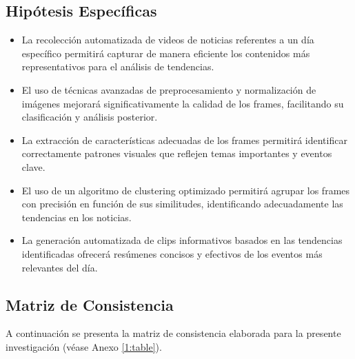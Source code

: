 \HipotesisGeneral
\subsection{Hipótesis Específicas}
\newcommand{\Hone}{
	La recolección automatizada de videos de noticias referentes a un día específico permitirá capturar de manera eficiente los contenidos más representativos para el análisis de tendencias.
}
\newcommand{\Htwo}{
	El uso de técnicas avanzadas de preprocesamiento y normalización de imágenes mejorará significativamente la calidad de los frames, facilitando su clasificación y análisis posterior.
}
\newcommand{\Hthree}{
	La extracción de características adecuadas de los frames permitirá identificar correctamente patrones visuales que reflejen temas importantes y eventos clave.
}
\newcommand{\Hfour}{
	El uso de un algoritmo de clustering optimizado permitirá agrupar los frames con precisión en función de sus similitudes, identificando adecuadamente las tendencias en los noticias.
}
\newcommand{\Hfive}{
	La generación automatizada de clips informativos basados en las tendencias identificadas ofrecerá resúmenes concisos y efectivos de los eventos más relevantes del día.
}
\begin{itemize}
	\item \Hone
	\item \Htwo
	\item \Hthree
	\item \Hfour
	\item \Hfive
\end{itemize}

\subsection{Matriz de Consistencia}
A continuación se presenta la matriz de consistencia elaborada para la presente investigación (véase Anexo \ref{1:table}).


